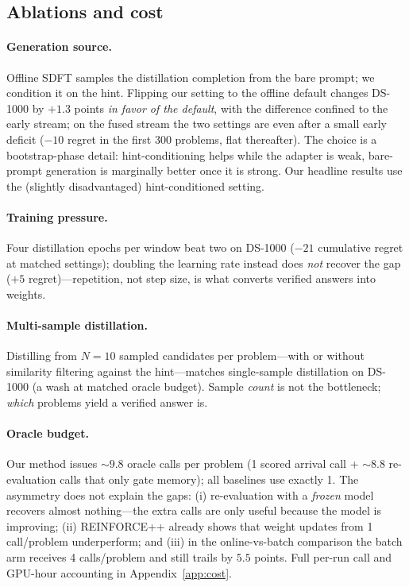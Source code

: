 \subsection{Ablations and cost}
\label{sec:exp-ablations}

\paragraph{Generation source.} Offline SDFT \citep{yang2024selfdistillation}
samples the distillation completion from the bare prompt; we condition it on the
hint. Flipping our setting to the offline default changes DS-1000 by $+1.3$
points \emph{in favor of the default}, with the difference confined to the early
stream; on the fused stream the two settings are even after a small early
deficit ($-10$ regret in the first 300 problems, flat thereafter). The choice is
a bootstrap-phase detail: hint-conditioning helps while the adapter is weak,
bare-prompt generation is marginally better once it is strong. Our headline
results use the (slightly disadvantaged) hint-conditioned setting.

\paragraph{Training pressure.} Four distillation epochs per window beat two on
DS-1000 ($-21$ cumulative regret at matched settings); doubling the learning
rate instead does \emph{not} recover the gap ($+5$ regret)---repetition, not
step size, is what converts verified answers into weights.

\paragraph{Multi-sample distillation.} Distilling from $N{=}10$ sampled
candidates per problem---with or without similarity filtering against the
hint---matches single-sample distillation on DS-1000 (a wash at matched
oracle budget). Sample \emph{count} is not the bottleneck; \emph{which} problems
yield a verified answer is.

\paragraph{Oracle budget.} Our method issues ${\sim}9.8$ oracle calls per
problem (1 scored arrival call + ${\sim}8.8$ re-evaluation calls that only gate
memory); all baselines use exactly 1. The asymmetry does not explain the gaps:
(i) re-evaluation with a \emph{frozen} model recovers almost nothing---the extra
calls are only useful because the model is improving; (ii) REINFORCE++ already
shows that weight updates from 1 call/problem underperform; and (iii) in the
online-vs-batch comparison the batch arm receives 4 calls/problem and still
trails by $5.5$ points. Full per-run call and GPU-hour accounting in
Appendix~\ref{app:cost}.
